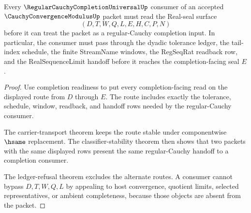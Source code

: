 \begin{theorem}
\label{thm:cauchy-convergence-modulus-regular-cauchy-handoff}
Every $\RegularCauchyCompletionUniversalUp$ consumer of an accepted $\CauchyConvergenceModulusUp$ packet must read the Real-seal surface
$$
(D,T,W,Q,L,E,H,C,P,N)
$$
before it can treat the packet as a regular-Cauchy completion input. In particular, the consumer must pass through the dyadic tolerance ledger, the tail-index schedule, the finite StreamName windows, the RegSeqRat readback row, and the RealSequenceLimit handoff before it reaches the completion-facing seal $E$.
\end{theorem}
\begin{proof}
Use completion readiness to put every completion-facing read on the displayed route from $D$ through $E$. The route includes exactly the tolerance, schedule, window, readback, and handoff rows needed by the regular-Cauchy consumer.

The carrier-transport theorem keeps the route stable under componentwise $\hsame$ replacement. The classifier-stability theorem then shows that two packets with the same displayed rows present the same regular-Cauchy handoff to a completion consumer.

The ledger-refusal theorem excludes the alternate routes. A consumer cannot bypass $D,T,W,Q,L$ by appealing to host convergence, quotient limits, selected representatives, or ambient completeness, because those objects are absent from the packet.
\end{proof}

